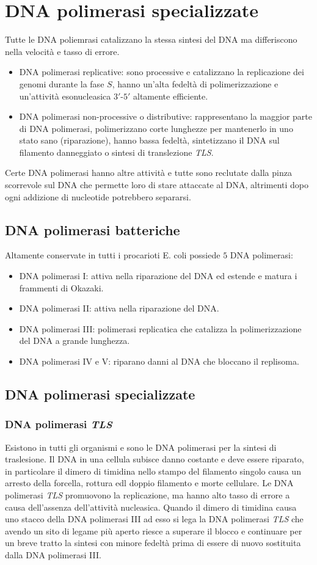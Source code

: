 \section{DNA polimerasi specializzate}
Tutte le DNA poliemrasi catalizzano la stessa sintesi del DNA ma differiscono nella velocit\`a e tasso di errore. 
\begin{itemize}
	\item DNA polimerasi replicative: sono processive e catalizzano la replicazione dei genomi durante la fase $S$, hanno un'alta fedelt\`a di polimerizzazione e un'attivit\`a
		esonucleasica $3'$-$5'$ altamente efficiente. 
	\item DNA polimerasi non-processive o distributive: rappresentano la maggior parte di DNA polimerasi, polimerizzano corte lunghezze per mantenerlo in uno stato sano (riparazione),
		hanno bassa fedelt\`a, sintetizzano il DNA sul filamento danneggiato o sintesi di translezione \emph{TLS}.
\end{itemize}
Certe DNA polimerasi hanno altre attivit\`a e tutte sono reclutate dalla pinza scorrevole sul DNA che permette loro di stare attaccate al DNA, altrimenti dopo ogni addizione di 
nucleotide potrebbero separarsi. 
\subsection{DNA polimerasi batteriche}
Altamente conservate in tutti i procarioti E. coli possiede $5$ DNA polimerasi:
\begin{itemize}
	\item DNA polimerasi I: attiva nella riparazione del DNA ed estende e matura i frammenti di Okazaki.
	\item DNA polimerasi II: attiva nella riparazione del DNA.
	\item DNA polimerasi III: polimerasi replicatica che catalizza la polimerizzazione del DNA a grande lunghezza.
	\item DNA polimerasi IV e V: riparano danni al DNA che bloccano il replisoma. 
\end{itemize}
\subsection{DNA polimerasi specializzate}
\subsubsection{DNA polimerasi \emph{TLS}}
Esistono in tutti gli organismi e sono le DNA polimerasi per la sintesi di traslesione. Il DNA in una cellula subisce danno costante e deve essere riparato, in particolare il dimero di 
timidina nello stampo del filamento singolo causa un arresto della forcella, rottura edl doppio filamento e morte cellulare. Le DNA polimerasi \emph{TLS} promuovono la replicazione, ma
hanno alto tasso di errore a causa dell'assenza dell'attivit\`a nucleasica. Quando il dimero di timidina causa uno stacco della DNA polimerasi III ad esso si lega la DNA polimerasi 
\emph{TLS} che avendo un sito di legame pi\`u aperto riesce a superare il blocco e continuare per un breve tratto la sintesi con minore fedelt\`a prima di essere di nuovo sostituita
dalla DNA polimerasi III. 
